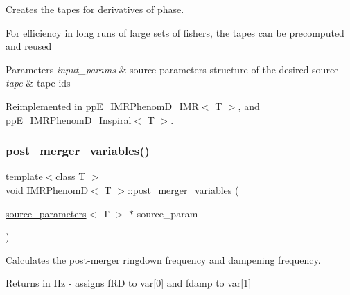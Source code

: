 Creates the tapes for derivatives of phase. 

For efficiency in long runs of large sets of fishers, the tapes can be precomputed and reused 
\begin{DoxyParams}{Parameters}
{\em input\+\_\+params} & source parameters structure of the desired source \\
\hline
{\em tape} & tape ids \\
\hline
\end{DoxyParams}


Reimplemented in \hyperlink{classppE__IMRPhenomD__IMR_acf2ed8617b3e24ecc273a409ff579ce4}{pp\+E\+\_\+\+I\+M\+R\+Phenom\+D\+\_\+\+I\+M\+R$<$ T $>$}, and \hyperlink{classppE__IMRPhenomD__Inspiral_a2fb1a8fb66e4204dbe397b792933afbe}{pp\+E\+\_\+\+I\+M\+R\+Phenom\+D\+\_\+\+Inspiral$<$ T $>$}.

\mbox{\label{classIMRPhenomD_a0d33a9a937a36f395300bab4276102af}} 
\subsubsection{\texorpdfstring{post\+\_\+merger\+\_\+variables()}{post\_merger\_variables()}}
{\footnotesize\ttfamily template$<$class T $>$ \\
void \hyperlink{classIMRPhenomD}{I\+M\+R\+PhenomD}$<$ T $>$\+::post\+\_\+merger\+\_\+variables (\begin{DoxyParamCaption}\item[{\hyperlink{structsource__parameters}{source\+\_\+parameters}$<$ T $>$ $\ast$}]{source\+\_\+param }\end{DoxyParamCaption})\hspace{0.3cm}{\ttfamily [virtual]}}



Calculates the post-\/merger ringdown frequency and dampening frequency. 

Returns in Hz -\/ assigns f\+RD to var\mbox{[}0\mbox{]} and fdamp to var\mbox{[}1\mbox{]} \mbox{\label{classIMRPhenomD_ade98ea0729f58a3216ecec948dec9e4a}} 
